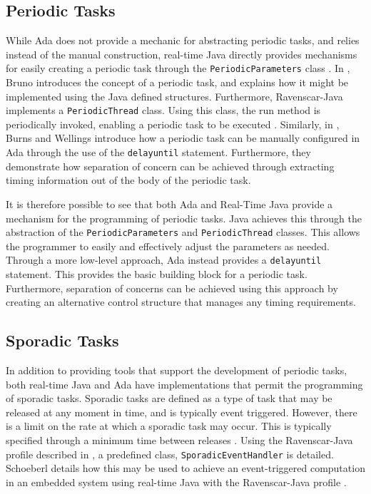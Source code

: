 \subsection{Periodic Tasks} While Ada does not provide a mechanic for
abstracting periodic tasks, and relies instead of the manual construction,
real-time Java directly provides mechanisms for easily creating a periodic task
through the \texttt{PeriodicParameters} class \cite{real-time-systems}. In
\cite{periodic-java-thread}, Bruno introduces the concept of a periodic task,
and explains how it might be implemented using the Java defined structures.
Furthermore, Ravenscar-Java implements a \texttt{PeriodicThread} class. Using
this class, the run method is periodically invoked, enabling a periodic task to
be executed \cite{ravenscar-java}.  Similarly, in \cite{burns1998concurrency},
Burns and Wellings introduce how a periodic task can be manually configured in
Ada through the use of the \texttt{delay\textunderscore{}until} statement.
Furthermore, they demonstrate how separation of concern can be achieved through
extracting timing information out of the body of the periodic task.

\par\bigskip\noindent
It is therefore possible to see that both Ada and
Real-Time Java provide a mechanism for the programming of periodic tasks. Java
achieves this through the abstraction of the \texttt{PeriodicParameters} and
\texttt{PeriodicThread} classes.  This allows the programmer to easily and
effectively adjust the parameters as needed.  Through a more low-level
approach, Ada instead provides a \texttt{delay\textunderscore{}until}
statement. This provides the basic building block for a periodic task.
Furthermore, separation of concerns can be achieved using this approach by
creating an alternative control structure that manages any timing requirements.

\subsection{Sporadic Tasks}
In addition to providing tools that support the development of periodic tasks,
both real-time Java and Ada have implementations that permit the programming of
sporadic tasks.  Sporadic tasks are defined as a type of task that may be
released at any moment in time, and is typically event triggered. However,
there is a limit on the rate at which a sporadic task may occur. This is
typically specified through a minimum time between releases \cite{11111101}.
Using the Ravenscar-Java profile described in \cite{ravenscar-java}, a
predefined class, \texttt{SporadicEventHandler} is detailed. Schoeberl details
how this may be used to achieve an event-triggered computation in an embedded
system using real-time Java with the Ravenscar-Java profile \cite{1300334}.

